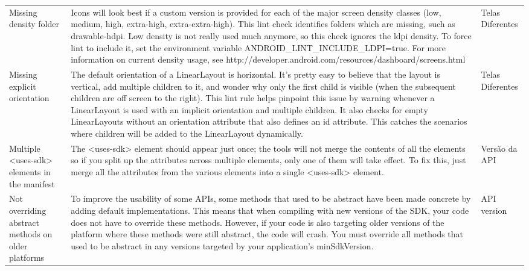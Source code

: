 \begin{landscape}
\begin{longtable}{p{30mm}|p{180mm}|p{25mm}}
Missing density folder
&Icons will look best if a custom version is provided for each of the major screen density classes (low, medium, high, extra-high, extra-extra-high). This lint check identifies folders which are missing, such as drawable-hdpi. Low density is not really used much anymore, so this check ignores the ldpi density. To force lint to include it, set the environment variable ANDROID\_LINT\_INCLUDE\_LDPI=true. For more information on current density usage, see http://developer.android.com/resources/dashboard/screens.html
&Telas Diferentes\\

Missing explicit orientation
&The default orientation of a LinearLayout is horizontal. It's pretty easy to believe that the layout is vertical, add multiple children to it, and wonder why only the first child is visible (when the subsequent children are off screen to the right). This lint rule helps pinpoint this issue by warning whenever a LinearLayout is used with an implicit orientation and multiple children.  It also checks for empty LinearLayouts without an orientation attribute that also defines an id attribute. This catches the scenarios where children will be added to the LinearLayout dynamically.
&Telas Diferentes\\

Multiple <uses-sdk> elements in the manifest
&The <uses-sdk> element should appear just once; the tools will not merge the contents of all the elements so if you split up the attributes across multiple elements, only one of them will take effect. To fix this, just merge all the attributes from the various elements into a single <uses-sdk> element.
&Versão da API\\

Not overriding abstract methods on older platforms
&To improve the usability of some APIs, some methods that used to be abstract have been made concrete by adding default implementations. This means that when compiling with new versions of the SDK, your code does not have to override these methods.  However, if your code is also targeting older versions of the platform where these methods were still abstract, the code will crash. You must override all methods that used to be abstract in any versions targeted by your application's minSdkVersion.
&API version\\


\end{longtable}
\end{landscape}
